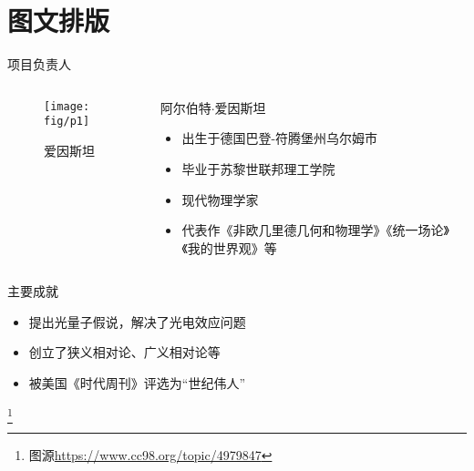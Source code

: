 \documentclass[utf8]{beamer}
\begin{document}
\section{图文排版}
\begin{frame}{\mylogo 项目负责人}
	\begin{columns}
		\begin{column}{.4\linewidth}
			\begin{figure}[h]
				\centering
				\texttt{[image: fig/p1]}
				\caption{爱因斯坦}
				\label{fig:1}
			\end{figure}	
		\end{column}
		\begin{column}{.7\linewidth}	
		{阿尔伯特$\cdot$爱因斯坦}
		\begin{itemize}
		\item 出生于德国巴登-符腾堡州乌尔姆市
		\item \alert{毕业于苏黎世联邦理工学院}
		\item 现代物理学家
		\item 代表作《非欧几里德几何和物理学》《统一场论》《我的世界观》等
		\end{itemize}
	\end{column}
\end{columns}
\vspace{3ex}
{主要成就}
\begin{itemize}
\item 提出\alert{光量子假说}，解决了\alert{光电效应问题}
\item 创立了狭义相对论、广义相对论等
\item 被美国《时代周刊》评选为\alert{“世纪伟人”}
\end{itemize}
\footnote{图源\href{https://www.cc98.org/topic/4979847}{https://www.cc98.org/topic/4979847}}
\end{frame}
\end{document}
